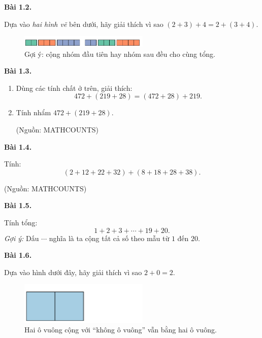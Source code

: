 \documentclass[14pt,a4paper]{extbook}
\newenvironment{problem}[1][]{
  \par\noindent\textbf{Bài #1.}\ \ignorespaces
}{\par}
\begin{document}
\begin{problem}[1.2]
Dựa vào \emph{hai hình vẽ} bên dưới, hãy giải thích vì sao
$(2+3)+4=2+(3+4)$.

\begin{figure}[ht!]
  \centering
  \includegraphics[width=0.55\textwidth]{img/fig-prob1.2.pdf}
  \caption*{\small Gợi ý: cộng nhóm đầu tiên hay nhóm sau đều cho cùng tổng.}
\end{figure}
\end{problem}

\begin{problem}[1.3]
\begin{enumerate}[label=(\alph*)]
  \item Dùng các tính chất ở trên, giải thích:
  \[
  472+(219+28)=(472+28)+219.
  \]
  \item Tính nhẩm $472+(219+28)$.
  \begin{flushright}\small(Nguồn: MATHCOUNTS)\end{flushright}
\end{enumerate}
\end{problem}

\begin{problem}[1.4]
Tính:
\[
(2+12+22+32)+(8+18+28+38).
\]
\begin{flushright}\small(Nguồn: MATHCOUNTS)\end{flushright}
\end{problem}

\begin{problem}[1.5]
Tính tổng:
\[
1+2+3+\cdots+19+20.
\]
\textit{Gợi ý:} Dấu \texttt{$\cdots$} nghĩa là ta cộng tất cả số theo
mẫu từ $1$ đến $20$.
\end{problem}


\begin{problem}[1.6]
Dựa vào hình dưới đây, hãy giải thích vì sao $2 + 0 = 2$.

\begin{figure}[ht!]
  \centering
  \includegraphics[width=0.55\textwidth]{img/fig-prob1.6.pdf}
  \caption*{\small Hai ô vuông cộng với “không ô vuông” vẫn bằng hai ô vuông.}
\end{figure}
\end{problem}
\end{document}
